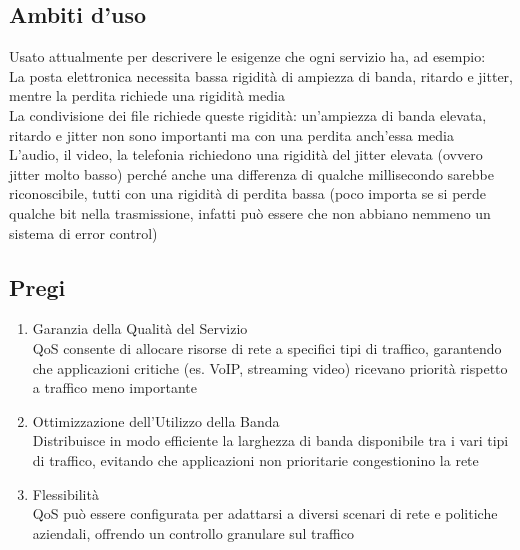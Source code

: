 \documentclass[10pt,oneside,a4paper]{article}
\begin{document}
\subsection{Ambiti d'uso}
Usato attualmente per descrivere le esigenze che ogni servizio ha, ad esempio:\\
La posta elettronica necessita bassa rigidità di ampiezza di banda, ritardo e jitter, mentre la perdita richiede una rigidità media\\
La condivisione dei file richiede queste rigidità: un'ampiezza di banda elevata, ritardo e jitter non sono importanti ma con una perdita anch'essa media\\
L'audio, il video, la telefonia richiedono una rigidità del jitter elevata (ovvero jitter molto basso) perché anche una differenza di qualche millisecondo sarebbe riconoscibile, tutti con una rigidità di perdita bassa (poco importa se si perde qualche bit nella trasmissione, infatti può essere che non abbiano nemmeno un sistema di error control)
\subsection{Pregi}
\begin{enumerate}
\item Garanzia della Qualità del Servizio\\
QoS consente di allocare risorse di rete a specifici tipi di traffico, garantendo che applicazioni critiche (es. VoIP, streaming video) ricevano priorità rispetto a traffico meno importante
\item Ottimizzazione dell'Utilizzo della Banda\\
Distribuisce in modo efficiente la larghezza di banda disponibile tra i vari tipi di traffico, evitando che applicazioni non prioritarie congestionino la rete
\item Flessibilità\\
QoS può essere configurata per adattarsi a diversi scenari di rete e politiche aziendali, offrendo un controllo granulare sul traffico
\end{enumerate}
\end{document}
